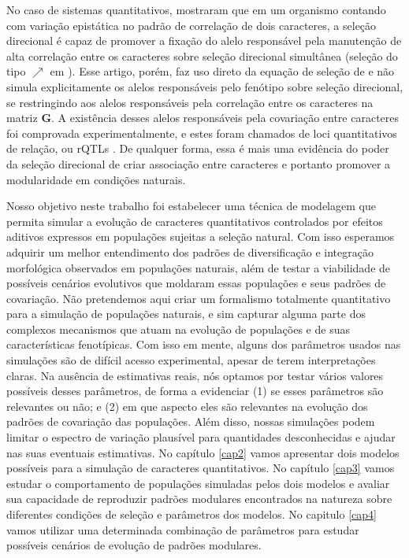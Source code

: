 No caso de sistemas quantitativos, \cite{Pavlicev2010} mostraram que em um
organismo contando com variação epistática no padrão de correlação de dois
caracteres, a seleção direcional é capaz de promover a fixação do alelo
responsável pela manutenção de alta correlação entre os caracteres sobre
seleção direcional simultânea  (seleção do tipo $\nearrow$ em
\cite{Jones2004}).
Esse artigo, porém, faz uso direto da equação de seleção de
\cite{Lande1979} e não simula explicitamente os alelos responsáveis pelo
fenótipo sobre seleção direcional, se restringindo aos alelos
responsáveis pela correlação entre os caracteres na matriz $\mathbf{G}$.
A existência desses alelos responsáveis pela covariação entre caracteres foi
comprovada experimentalmente, e estes foram chamados de loci
quantitativos de relação, ou rQTLs \citep{Pavlicev2008a}.
De qualquer forma, essa é mais uma evidência do poder da seleção
direcional de criar associação entre caracteres e portanto promover a
modularidade em condições naturais.

Nosso objetivo neste trabalho foi estabelecer uma técnica de modelagem
que permita simular a evolução de caracteres quantitativos controlados
por efeitos aditivos expressos em populações sujeitas a seleção natural.
Com isso esperamos adquirir um melhor entendimento dos padrões de
diversificação e integração morfológica observados em populações
naturais, além de testar a viabilidade de possíveis cenários
evolutivos que moldaram essas populações e seus padrões de covariação.
Não pretendemos aqui criar um formalismo totalmente quantitativo para a
simulação de populações naturais, e sim capturar alguma parte dos
complexos mecanismos que atuam na evolução de populações e de suas
características fenotípicas.
Com isso em mente, alguns dos parâmetros usados nas simulações são de
difícil acesso experimental, apesar de terem interpretações claras.
Na ausência de estimativas reais, nós optamos por testar vários valores
possíveis desses parâmetros, de forma a evidenciar (1) se esses
parâmetros são relevantes ou não; e (2) em que aspecto eles são
relevantes na evolução dos padrões de covariação das populações.
Além disso, nossas simulações podem limitar o espectro de variação
plausível para quantidades desconhecidas e ajudar nas suas eventuais
estimativas.
No capítulo \ref{cap2} vamos apresentar dois modelos possíveis para a
simulação de caracteres quantitativos.
No capítulo \ref{cap3} vamos estudar o comportamento de populações
simuladas pelos dois modelos e avaliar sua capacidade de reproduzir
padrões modulares encontrados na natureza sobre diferentes condições de
seleção e parâmetros dos modelos.
No capitulo \ref{cap4} vamos utilizar uma determinada combinação de
parâmetros para estudar possíveis cenários de evolução de padrões
modulares.
